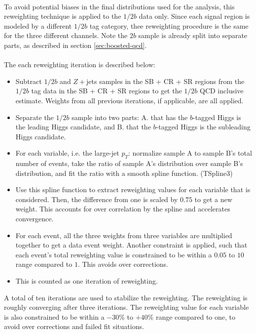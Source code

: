 \paragraph{}
To avoid potential biases in the final distributions used for the analysis, this reweighting technique is applied to the $1/2b$ data only. 
Since each signal region is modeled by a different $1/2b$ tag category, thee reweighting procedure is the same for the three different channels. 
Note the $2b$ sample is already split into separate parts, as described in section \ref{sec:boosted-qcd}.

\paragraph{}
The each reweighting iteration is described below:
\begin{itemize}
\item Subtract $1/2b$ \ttbar and $Z+$jets samples in the SB + CR + SR regions from the $1/2b$ tag data in the SB + CR + SR regions to get the $1/2b$ QCD inclusive estimate. Weights from all previous iterations, if applicable, are all applied.
\item Separate the $1/2b$ sample into two parts: A. that has the $b$-tagged Higgs is the leading \pt Higgs candidate, and B. that the $b$-tagged Higgs is the subleading \pt Higgs candidate.
\item For each variable, i.e. the large-\R jet $p_{T}$: normalize sample A to sample B's total number of events, take the ratio of sample A's distribution over sample B's distribution, and fit the ratio with a smooth spline function. (TSpline3)
\item Use this spline function to extract reweighting values for each variable that is considered. Then, the difference from one is scaled by $0.75$ to get a new weight. This accounts for over correlation by the spline and accelerates convergence.
\item For each event, all the three weights from three variables are multiplied together to get a data event weight. Another constraint is applied, such that each event's total reweighting value is constrained to be within a $0.05$ to $10$ range compared to $1$. This avoids over corrections.
\item This is counted as one iteration of reweighting. 
\end{itemize}
A total of ten iterations are used to stabilize the reweighting. 
The reweighting is roughly converging after three iterations.
The reweighting value for each variable is also constrained to be within a $-30\%$ to $+40\%$ range compared to one, to avoid over corrections and failed fit situations.

